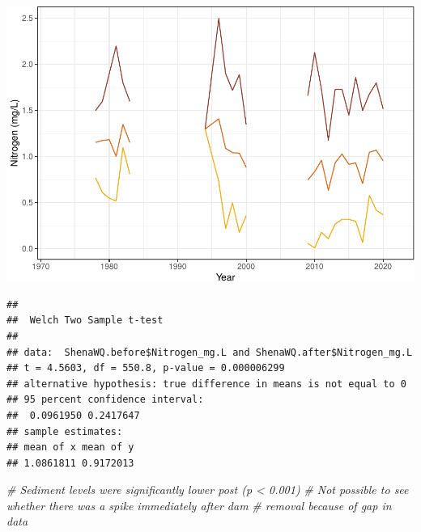 \documentclass[
  12pt,
]{article}
\newenvironment{Shaded}{\begin{snugshade}}{\end{snugshade}}
\newcommand{\AttributeTok}[1]{\textcolor[rgb]{0.77,0.63,0.00}{#1}}
\newcommand{\CommentTok}[1]{\textcolor[rgb]{0.56,0.35,0.01}{\textit{#1}}}
\newcommand{\ConstantTok}[1]{\textcolor[rgb]{0.00,0.00,0.00}{#1}}
\newcommand{\FunctionTok}[1]{\textcolor[rgb]{0.00,0.00,0.00}{#1}}
\newcommand{\NormalTok}[1]{#1}
\newcommand{\OtherTok}[1]{\textcolor[rgb]{0.56,0.35,0.01}{#1}}
\newcommand{\SpecialCharTok}[1]{\textcolor[rgb]{0.00,0.00,0.00}{#1}}
\begin{document}
\includegraphics{Project_Template_files/figure-latex/Nitrogen_Analysis-2.pdf}

\begin{Shaded}
\end{Shaded}

\begin{verbatim}
## 
##  Welch Two Sample t-test
## 
## data:  ShenaWQ.before$Nitrogen_mg.L and ShenaWQ.after$Nitrogen_mg.L
## t = 4.5603, df = 550.8, p-value = 0.000006299
## alternative hypothesis: true difference in means is not equal to 0
## 95 percent confidence interval:
##  0.0961950 0.2417647
## sample estimates:
## mean of x mean of y 
## 1.0861811 0.9172013
\end{verbatim}

\begin{Shaded}
\begin{Highlighting}[]
\CommentTok{\# Sediment levels were significantly lower post (p \textless{} 0.001)}
\CommentTok{\# Not possible to see whether there was a spike immediately after dam }
\CommentTok{\# removal because of gap in data}
\end{Highlighting}
\end{Shaded}
\end{document}
